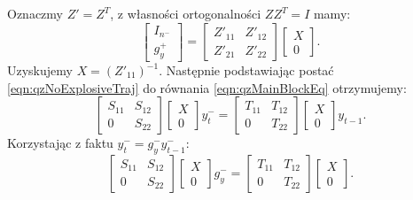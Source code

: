 Oznaczmy $Z' = Z^T$, z własności ortogonalności $ZZ^T = I$ mamy:
\begin{equation}
    \begin{bmatrix}
        I_{n^-} \\
        g_y^+
    \end{bmatrix} = 
    \begin{bmatrix}
    Z'_{11} & Z'_{12} \\
    Z'_{21} & Z'_{22}
    \end{bmatrix}
    \begin{bmatrix}
        X \\
        0
    \end{bmatrix}.
\end{equation}
Uzyskujemy $X = (Z'_{11})^{-1}$. Następnie podstawiając postać \eqref{eqn:qzNoExplosiveTraj} do równania \eqref{eqn:qzMainBlockEq} otrzymujemy:
\begin{equation}
    \begin{bmatrix}
    S_{11} & S_{12} \\
    0 & S_{22}
    \end{bmatrix}
    \begin{bmatrix}
        X \\
        0
    \end{bmatrix}  y_t^- 
    = 
    \begin{bmatrix}
    T_{11} & T_{12} \\
    0 & T_{22}
    \end{bmatrix} 
    \begin{bmatrix}
        X \\
        0
    \end{bmatrix} y_{t-1}.
\end{equation}
Korzystając z faktu $y_t^- = g_y^- y_{t-1}^-$:
\begin{equation}
    \begin{bmatrix}
    S_{11} & S_{12} \\
    0 & S_{22}
    \end{bmatrix}
    \begin{bmatrix}
        X \\
        0
    \end{bmatrix}  g_y^-
    = 
    \begin{bmatrix}
    T_{11} & T_{12} \\
    0 & T_{22}
    \end{bmatrix} 
    \begin{bmatrix}
        X \\
        0
    \end{bmatrix}.
\end{equation}
